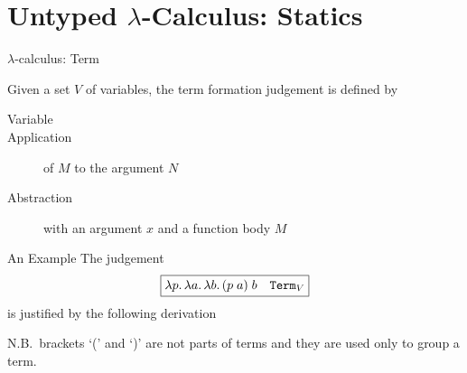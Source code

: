 \section{Untyped $\lambda$-Calculus: Statics}


\begin{frame}{$\lambda$-calculus: Term}

\begin{definition}
  Given a set $V$ of variables, 
  the term formation judgement is defined by
  \begin{description}
     \item[Variable]
       \hfill
       \begin{prooftree}
       \end{prooftree}
 
    \item[Application]
      of $M$ to the argument $N$
      \hfill
      \begin{prooftree}
      \end{prooftree}

    \item[Abstraction]
      with an argument $x$ and a function body $M$
      \hfill
      \begin{prooftree}
      \end{prooftree}
  \end{description}
\end{definition}
 
\end{frame}


\begin{frame}{An Example}
  The judgement
\[
  \fbox{$\lambda p.\, \lambda a.\, \lambda b.\, (p\;a)\; b \quad \term_V$}
\]
is justified by the following derivation
  \begin{prooftree}
    \footnotesize
  \end{prooftree}
  N.B.\ brackets `(' and `)' are not parts of terms and they are used only to group a term.
\end{frame}


